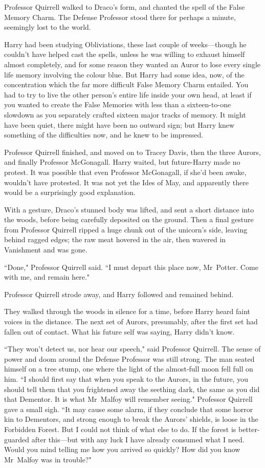 Professor Quirrell walked to Draco's form, and chanted the spell of the False Memory Charm. The Defense Professor stood there for perhaps a minute, seemingly lost to the world.

Harry had been studying Obliviations, these last couple of weeks—though he couldn't have helped cast the spells, unless he was willing to exhaust himself almost completely, and for some reason they wanted an Auror to lose every single life memory involving the colour blue. But Harry had some idea, now, of the concentration which the far more difficult False Memory Charm entailed. You had to try to live the other person's entire life inside your own head, at least if you wanted to create the False Memories with less than a sixteen-to-one slowdown as you separately crafted sixteen major tracks of memory. It might have been quiet, there might have been no outward sign; but Harry knew something of the difficulties now, and he knew to be impressed.

Professor Quirrell finished, and moved on to Tracey Davis, then the three Aurors, and finally Professor McGonagall. Harry waited, but future-Harry made no protest. It was possible that even Professor McGonagall, if she'd been awake, wouldn't have protested. It was not yet the Ides of May, and apparently there would be a surprisingly good explanation.

With a gesture, Draco's stunned body was lifted, and sent a short distance into the woods, before being carefully deposited on the ground. Then a final gesture from Professor Quirrell ripped a huge chunk out of the unicorn's side, leaving behind ragged edges; the raw meat hovered in the air, then wavered in Vanishment and was gone.

``Done," Professor Quirrell said. ``I must depart this place now, Mr~Potter. Come with me, and remain here."

Professor Quirrell strode away, and Harry followed and remained behind.

They walked through the woods in silence for a time, before Harry heard faint voices in the distance. The next set of Aurors, presumably, after the first set had fallen out of contact. What his future self was saying, Harry didn't know.

``They won't detect us, nor hear our speech," said Professor Quirrell. The sense of power and doom around the Defense Professor was still strong. The man seated himself on a tree stump, one where the light of the almost-full moon fell full on him. ``I should first say that when you speak to the Aurors, in the future, you should tell them that you frightened away the seething dark, the same as you did that Dementor. It is what Mr~Malfoy will remember seeing." Professor Quirrell gave a small sigh. ``It may cause some alarm, if they conclude that some horror kin to Dementors, and strong enough to break the Aurors' shields, is loose in the Forbidden Forest. But I could not think of what else to do. If the forest is better-guarded after this—but with any luck I have already consumed what I need. Would you mind telling me how you arrived so quickly? How did you know Mr~Malfoy was in trouble?"

